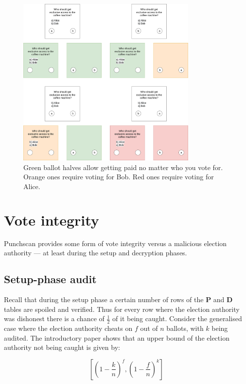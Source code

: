\begin{figure}
\centering
\includegraphics[width=0.8\textwidth]{../resources/vote_buying_split_highlighted_no_selection.drawio.png}
\caption{Green ballot halves allow getting paid no matter who you vote for. Orange ones require voting for Bob. Red ones require voting for Alice.}
\label{fig:vote_buying}
\end{figure}

\section{Vote integrity}

Punchscan provides some form of vote integrity versus a malicious election
authority --- at least during the setup and decryption phases.

\subsection{Setup-phase audit}

Recall that during the setup phase a certain number of rows of the \textbf{P} and
\textbf{D} tables are spoiled and verified. Thus for every row where the election authority 
was dishonest there is a chance of $\frac{1}{2}$ of it being caught. Consider the
generalised case where the election authority cheats on $f$ out of $n$ ballots,
with $k$ being audited. The introductory paper shows that an upper bound of the
election authority not being caught is given by:

\[
	[(1 - \frac{k}{n})^f, (1 - \frac{f}{n})^k]
\]

